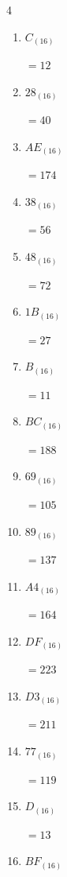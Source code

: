 \begin{multicols}{4}
\begin{enumerate}
        $=235$

\columnbreak %

  \item $C_{(16)}$

        $=12$

  \item $28_{(16)}$

        $=40$

  \item $AE_{(16)}$

        $=174$

  \item $38_{(16)}$

        $=56$

  \item $48_{(16)}$

        $=72$

  \item $1B_{(16)}$

        $=27$

  \item $B_{(16)}$

        $=11$

  \item $BC_{(16)}$

        $=188$

  \item $69_{(16)}$

        $=105$

  \item $89_{(16)}$

        $=137$

  \item $A4_{(16)}$

        $=164$

  \item $DF_{(16)}$

        $=223$

  \item $D3_{(16)}$

        $=211$

  \item $77_{(16)}$

        $=119$

  \item $D_{(16)}$

        $=13$

\columnbreak %

  \item $BF_{(16)}$


\end{enumerate}
\end{multicols}
